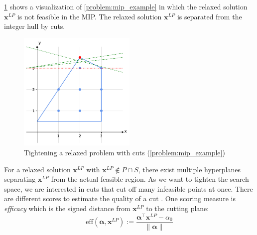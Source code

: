 \cref{fig:cuts} shows a visualization of \cref{problem:mip_example} in which the relaxed solution $\mathbf x^{LP}$ is not feasible in the MIP. The relaxed solution $\mathbf x^{LP}$ is separated from the integer hull by cuts.

\begin{figure}[!h]
    \centering
    \includegraphics[width=0.5\textwidth]{Images/mip_cut.pdf}
    \caption{Tightening a relaxed problem with cuts (\cref{problem:mip_example})}
    \label{fig:cuts}
\end{figure}

For a relaxed solution $\mathbf x^{LP}$ with $\mathbf x^{LP} \notin P \cap S$, there exist multiple hyperplanes separating $\mathbf x^{LP}$ from the actual feasible region. %
As we want to tighten the search space, we are interested in cuts that cut off many infeasible points at once. There are different scores to estimate the quality of a cut \cite{turner_adaptive_2023}.
\newpage
One scoring measure is \textit{efficacy} which is the signed distance from $\mathbf x^{LP}$ to the cutting plane:
\begin{equation}
    \text{eff}(\boldsymbol \alpha, \mathbf x^{LP}) := \frac{\boldsymbol \alpha^\intercal \mathbf x^{LP} - \alpha_0}{\lVert \boldsymbol \alpha \rVert}
\end{equation}

